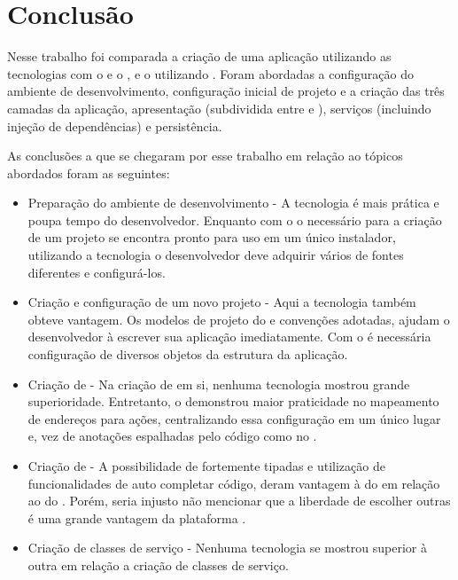 \chapter{Conclusão}

Nesse trabalho foi comparada a criação de uma aplicação  utilizando as tecnologias  com o  e o , e o  utilizando . Foram abordadas a configuração do ambiente de desenvolvimento, configuração inicial de projeto e a criação das três camadas da aplicação, apresentação (subdividida entre  e ), serviços (incluindo injeção de dependências) e persistência.

As conclusões a que se chegaram por esse trabalho em relação ao tópicos abordados foram as seguintes:

\begin{itemize}
  \item Preparação do ambiente de desenvolvimento - A tecnologia  é mais prática e poupa tempo do desenvolvedor. Enquanto com o  o necessário para a criação de um projeto se encontra pronto para uso em um único instalador, utilizando a tecnologia  o desenvolvedor deve adquirir vários  de fontes diferentes e configurá-los.
  \item Criação e configuração de um novo projeto - Aqui a tecnologia  também obteve vantagem. Os modelos de projeto  do  e convenções adotadas, ajudam o desenvolvedor à escrever sua aplicação imediatamente. Com o  é necessária configuração de diversos objetos da estrutura da aplicação.
  \item Criação de  - Na criação de  em si, nenhuma tecnologia mostrou grande superioridade. Entretanto, o  demonstrou maior praticidade no mapeamento de endereços para ações, centralizando essa configuração em um único lugar e, vez de anotações espalhadas pelo código como no .
  \item Criação de  - A possibilidade de  fortemente tipadas e utilização de funcionalidades de auto completar código, deram vantagem à  do  em relação ao  do . Porém, seria injusto não mencionar que a liberdade de escolher outras  é uma grande vantagem da plataforma .
  \item Criação de classes de serviço - Nenhuma tecnologia se mostrou superior à outra em relação a criação de classes de serviço.

\end{itemize}
